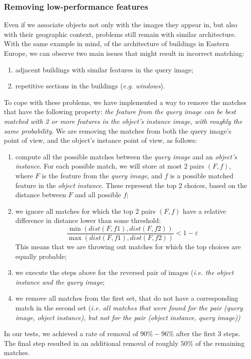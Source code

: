 \documentclass[a4paper,onecolumn,oneside,titlepage,11pt]{report}
\begin{document}
\subsubsection{Removing low-performance features}
Even if we associate objects not only with the images they appear in, but also with their geographic context, problems still remain with similar architecture. With the same example in mind, of the architecture of buildings in Eastern Europe, we can observe two main issues that might result in incorrect matching:
\begin{enumerate}
	\item adjacent buildings with similar features in the query image;
	\item repetitive sections in the buildings (\emph{e.g. windows}).
\end{enumerate}
To cope with these problems, we have implemented a way to remove the matches that have the following property: \emph{the feature from the query image can be best matched with 2 or more features in the object's instance image, with roughly the same probability}. We are removing the matches from both the query image's point of view, and the object's instance point of view, as follows:
\begin{enumerate}
	\item compute all the possible matches between the \emph{query image} and an \emph{object's instance}. For each possible match, we will store at most 2 pairs $(F, f)$, where $F$ is the feature from the \emph{query image}, and $f$ is a possible matched feature in the \emph{object instance}. These represent the top 2 choices, based on the distance between $F$ and all possible $f$;
	\item we ignore all matches for which the top 2 pairs $(F, f)$ have a relative difference in distance lower than some threshold:
	$$
	\frac{\min(dist(F, f1), dist(F, f2))}{\max(dist(F, f1), dist(F, f2))} < 1 - \varepsilon
	$$
	This means that we are throwing out matches for which the top choices are equally probable;
	\item we execute the steps above for the reversed pair of images (\emph{i.e. the object instance and the query image};
	\item we remove all matches from the first set, that do not have a corresponding match in the second set (\emph{i.e. all matches that were found for the pair \emph{(query image, object instance)}, but not for the pair \emph{(object instance, query image)})}
\end{enumerate}
In our tests, we achieved a rate of removal of $90\% - 96\%$ after the first 3 steps. The final step resulted in an additional removal of roughly $50\%$ of the remaining matches.
\end{document}

